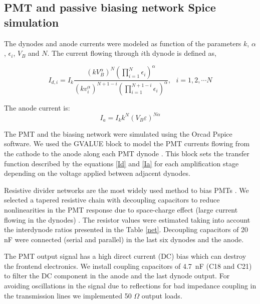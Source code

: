 \documentclass[letterpaper, 10 pt, conference]{ieeeconf}  %
\begin{document}
\subsection{PMT and passive biasing network Spice simulation}

The dynodes and anode currents were modeled as function of the parameters $k$, $\alpha$ , $\epsilon_i$, $V_B$ and $N$. The current flowing through $i$th dynode is defined as,

\begin{equation}
I_{d,i} = I_k \frac{(k V_B^\alpha)^N \left ( \prod_{i=1}^{N} \epsilon_i \right)^{\alpha}}{(k v_i^\alpha)^{N+1-i} \left ( \prod_{i=1}^{N+1-i} \epsilon_i \right)^{\alpha} }, \ \ \ i=1,2, \cdots N
\label{Id}
\end{equation}

The anode current is:
\begin{equation}
I_a = I_k k^N (V_B \varepsilon)^{N \alpha}
\label{Ia}
\end{equation}

The PMT and the biasing network were simulated using the Orcad Pspice software. We used the GVALUE block to model the PMT currents flowing from the cathode to the anode along each PMT dynode \cite{Krihely2014}. This block sets the transfer function described by the equations \ref{Id} and \ref{Ia} for each amplification stage depending on the voltage applied between adjacent dynodes. 


Resistive divider networks are the most widely used method to bias PMTs \cite{Camin1999PassiveAA}. We selected a tapered resistive chain with decoupling capacitors to reduce nonlinearities in the PMT response due to space-charge effect (large current flowing in the dynodes) \cite{Huang_2013, Hamamatsu2007}. The resistor values were estimated taking into account the interdynode ratios presented in the Table \ref{net}. Decoupling capacitors of 20 nF were connected (serial and parallel) in the last six dynodes and the anode.

The PMT output signal has a high direct current (DC) bias which can destroy the frontend electronics. We install coupling capacitors of 4.7~nF (C18 and C21) to filter the DC component in the anode and the last dynode output. For avoiding oscillations in the signal due to reflections for bad impedance coupling in the transmission lines we implemented 50 $\Omega$ output loads. 
\end{document}
